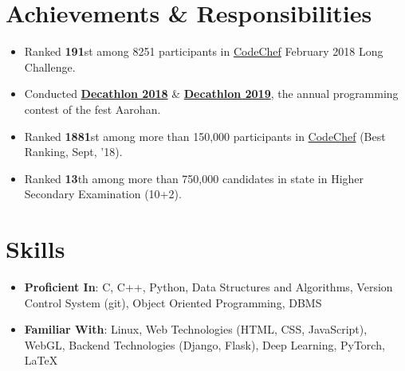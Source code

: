 \documentclass[a4paper,11pt]{article}
\newcommand{\resumeSubHeadingListStart}{\begin{itemize}[leftmargin=*, topsep=0pt]}
\newcommand{\resumeSubHeadingListEnd}{\end{itemize}}
\newcommand{\resumeItemListStart}{\begin{itemize}}
\newcommand{\resumeItemListEnd}{\end{itemize}\vspace{-5pt}}
\begin{document}
\section{Achievements \& Responsibilities}
    \resumeItemListStart
     \setlength{\itemsep}{0.5pt}
      \item
        {Ranked \textbf{191}st among 8251 participants in \href{https://www.codechef.com/rankings/FEB18?filterBy=Institution\%3DNational\%20Institute\%20of\%20Technology\%2C\%20Durgapur&order=asc&sortBy=rank}{CodeChef} February 2018 Long Challenge.}
      \item
        {Conducted \href{https://www.hackerrank.com/dec18}{\textbf{Decathlon 2018}} \& \href{https://www.hackerrank.com/decathlon19}{\textbf{Decathlon 2019}}, the annual programming contest of the fest Aarohan.}
      \item
        {Ranked \textbf{1881}st among more than 150,000 participants in \href{https://codechef.com/users/ayan_nitd}{CodeChef} (Best Ranking, Sept, '18).}
      \item
        {Ranked \textbf{13}th among more than 750,000 candidates in state in Higher Secondary Examination
        (10+2).}
    \resumeItemListEnd

\section{Skills}
 \resumeSubHeadingListStart
    \setlength{\itemsep}{1pt}
     \item\textbf{Proficient In}{: C, C++, Python, Data Structures and Algorithms, Version Control System (git), Object Oriented Programming, DBMS}\\
     \item\textbf{Familiar With}{: Linux, Web Technologies (HTML, CSS, JavaScript), WebGL, Backend Technologies (Django, Flask), Deep Learning, PyTorch, \LaTeX}
 \resumeSubHeadingListEnd
 
\end{document}
